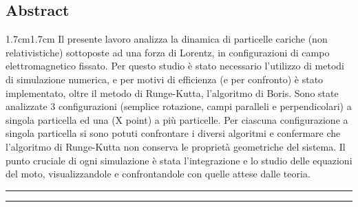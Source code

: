 \documentclass[10pt,a4paper]{article}
\begin{document}
\maketitle

\vfill
\begin{center}
    \section*{Abstract}
\end{center}

\begin{adjustwidth}{1.7cm}{1.7cm}
    Il presente lavoro analizza la dinamica di particelle cariche (non relativistiche) sottoposte ad una forza di Lorentz, in configurazioni di campo elettromagnetico fissato. Per questo studio è stato necessario l'utilizzo di metodi di simulazione numerica, e per motivi di efficienza (e per confronto) è stato implementato, oltre il metodo di Runge-Kutta, l'algoritmo di Boris. Sono state analizzate 3 configurazioni (semplice rotazione, campi paralleli e perpendicolari) a singola particella ed una (X point) a più particelle. Per ciascuna configurazione a singola particella si sono potuti confrontare i diversi algoritmi e confermare che l'algoritmo di Runge-Kutta non conserva le proprietà geometriche del sistema. Il punto cruciale di ogni simulazione è stata l'integrazione e lo studio delle equazioni del moto, visualizzandole e confrontandole con quelle attese dalle teoria.
\end{adjustwidth}
\vfill

\vfill\hrule
\tableofcontents
\vspace{0.5cm}\hrule\vspace{0.5cm}
\newpage

\end{document}
